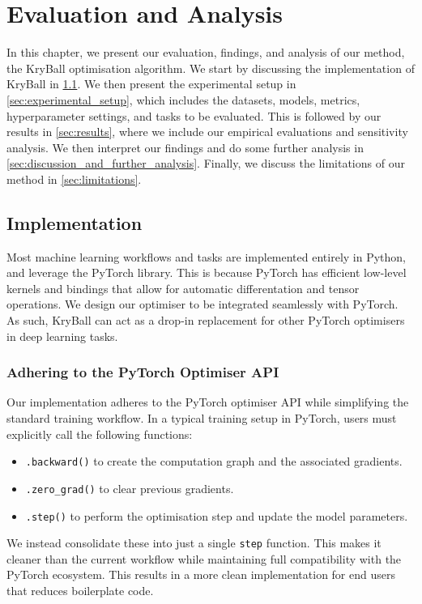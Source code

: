 \chapter{Evaluation and Analysis}
\label{chap:evaluation}

In this chapter, we present our evaluation, findings, and analysis of our method, the KryBall optimisation algorithm. We start by discussing the implementation of KryBall in \ref{sec:implementation}. We then present the experimental setup in \ref{sec:experimental_setup}, which includes the datasets, models, metrics, hyperparameter settings, and tasks to be evaluated. This is followed by our results in \ref{sec:results}, where we include our empirical evaluations and sensitivity analysis. We then interpret our findings and do some further analysis in \ref{sec:discussion_and_further_analysis}. Finally, we discuss the limitations of our method in \ref{sec:limitations}.

\section{Implementation}
\label{sec:implementation}

Most machine learning workflows and tasks are implemented entirely in Python, and leverage the PyTorch library. This is because PyTorch has efficient low-level kernels and bindings that allow for automatic differentation and tensor operations. We design our optimiser to be integrated seamlessly with PyTorch. As such, KryBall can act as a drop-in replacement for other PyTorch optimisers in deep learning tasks.

\subsection{Adhering to the PyTorch Optimiser API}
\label{ssec:adhering_to_the_pytorch_optimiser_api}

Our implementation adheres to the PyTorch optimiser API while simplifying the standard training workflow. In a typical training setup in PyTorch, users must explicitly call the following functions:
\begin{itemize}
    \item \verb|.backward()| to create the computation graph and the associated gradients.
    \item \verb|.zero_grad()| to clear previous gradients.
    \item \verb|.step()| to perform the optimisation step and update the model parameters.
\end{itemize}
We instead consolidate these into just a single \verb|step| function. This makes it cleaner than the current workflow while maintaining full compatibility with the PyTorch ecosystem. This results in a more clean implementation for end users that reduces boilerplate code. 

